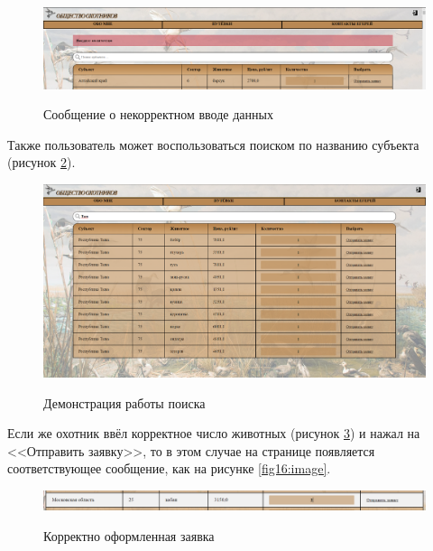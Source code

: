 	\begin{figure}[h]
		\centering
		\begin{center}
			{\includegraphics[scale=0.34]{schemes/screens/msg_error.png}}
			\caption{Сообщение о некорректном вводе данных}
			\label{fig13:image}
		\end{center}
	\end{figure}
	\newpage
	
	Также пользователь может воспользоваться поиском по названию субъекта (рисунок \ref{fig14:image}).
	
	\begin{figure}[h]
		\centering
		\begin{center}
			{\includegraphics[scale=0.3245]{schemes/screens/find.png}}
			\caption{Демонстрация работы поиска}
			\label{fig14:image}
		\end{center}
	\end{figure}
	\newpage

	Если же охотник ввёл корректное число животных (рисунок \ref{fig15:image}) и нажал на <<Отправить заявку>>, то в этом случае на странице появляется соответствующее сообщение, как на рисунке \ref{fig16:image}.
	
	\begin{figure}[h]
		\centering
		\begin{center}
			{\includegraphics[scale=0.34]{schemes/screens/right_data.png}}
			\caption{Корректно оформленная заявка}
			\label{fig15:image}
		\end{center}
	\end{figure}

